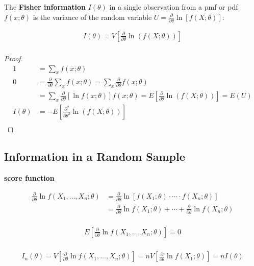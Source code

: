 \begin{definition}
    The \textbf{Fisher information} $I(\theta)$ in a single observation from a pmf or pdf $f(x;\theta)$ is the variance of the random variable $U=\frac{\partial}{\partial\theta}\ln[f(X;\theta)]$: 

    \begin{align*}
        I(\theta) = V\left[\frac{\partial}{\partial\theta}\ln(f(X;\theta))\right] \\
    \end{align*}

    \begin{proof}
        \begin{align*}
            1 & = \sum_xf(x;\theta) \\
            0 & = \frac{\partial}{\partial\theta}\sum_xf(x;\theta) = \sum_x\frac{\partial}{\partial\theta}f(x;\theta) \\
            & = \sum_x\frac{\partial}{\partial\theta}[\ln f(x;\theta)]f(x;\theta) = E\left[\frac{\partial}{\partial\theta}\ln(f(X;\theta))\right]=E(U) \\
            I(\theta) & = -E\left[\frac{\partial^2}{\partial\theta^2}\ln(f(X;\theta))\right] \\
        \end{align*}
    \end{proof}
\end{definition}

\subsection{Information in a Random Sample}

\textbf{score function}

\begin{align*}
    \frac{\partial}{\partial\theta}\ln f(X_1,\dots,X_n;\theta) & = \frac{\partial}{\partial\theta}\ln[f(X_1;\theta)\cdot \cdots \cdot f(X_n;\theta)] \\
    & = \frac{\partial}{\partial\theta}\ln f(X_1;\theta) + \cdots + \frac{\partial}{\partial\theta}\ln f(X_n;\theta) \\
\end{align*}

\begin{align*}
    E\left[\frac{\partial}{\partial\theta}\ln f(X_1,\dots,X_n;\theta)\right] = 0 \\
\end{align*}

\begin{align*}
    I_n(\theta) = V\left[\frac{\partial}{\partial\theta}\ln f(X_1,\dots,X_n;\theta)\right] = nV\left[\frac{\partial}{\partial\theta}\ln f(X_1;\theta)\right]=nI(\theta) \\
\end{align*}

